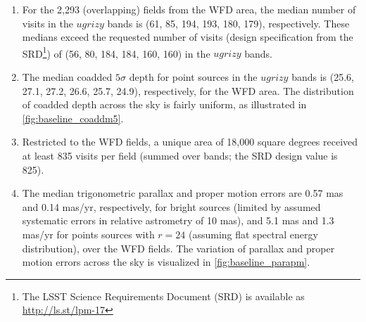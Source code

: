 \documentclass[DM,lsstdraft,authoryear,toc]{lsstdoc}
\begin{document}
\begin{enumerate}
\item For the 2,293 (overlapping) fields from the WFD area,
the median number of visits in the $ugrizy$ bands is (61, 85, 194, 193, 180,
179), respectively. These medians exceed the requested
number of visits (design specification from the SRD\footnote{The LSST
Science Requirements Document (SRD) is available as
\url{http://ls.st/lpm-17}}) of (56, 80, 184, 184, 160, 160) in the $ugrizy$
bands.
\item The median coadded $5\sigma$ depth
for point sources in the $ugrizy$ bands is (25.6, 27.1, 27.2, 26.6,
25.7, 24.9), respectively, for the WFD area. The distribution
of coadded depth across the sky is fairly uniform, as illustrated in \autoref{fig:baseline_coaddm5}.
\item Restricted to the WFD fields, a unique area of
18,000 square degrees received at least 835 visits per field (summed over bands;
the SRD design value is 825).
\item The median trigonometric parallax and proper motion errors are
0.57 mas and 0.14 mas/yr, respectively, for bright sources (limited by
assumed systematic errors in relative astrometry of 10 mas), and 5.1
mas and 1.3 mas/yr for points sources with $r=24$ (assuming flat
spectral energy distribution), over the WFD fields. The variation of parallax
and proper motion errors across the sky is visualized in \autoref{fig:baseline_parapm}.
\end{enumerate}
\end{document}
